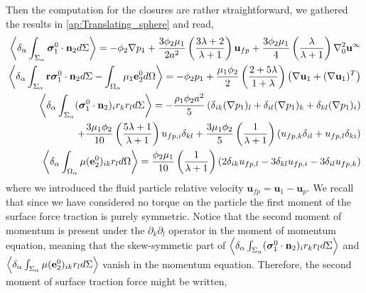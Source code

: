 Then the computation for the closures are rather straightforward, we gathered the results in \ref{ap:Translating_sphere} and read, 
\begin{align}
    \left<\delta_\alpha \int_{\Sigma_\alpha} \bm{\sigma}_1^0\cdot \textbf{n}_2 d\Sigma\right> = 
    - \phi_2 \mathbf{\nabla} p_1
    + \frac{3\phi_2\mu_1}{2 a^2} 
    \left(\frac{3\lambda+2}{\lambda+1}\right) \textbf{u}_{f p} 
    + \frac{3\phi_2\mu_1}{4} \left(\frac{\lambda}{\lambda+1}\right)\mathbf{\nabla}^2_0\textbf{u}^\infty\\
    \label{eq:first_mom}
    \left<\delta_\alpha \int_{\Sigma_\alpha} \textbf{r}\bm{\sigma}_1^0 \cdot \textbf{n}_2 d\Sigma - \int_{\Omega_\alpha} \mu_1 \textbf{e}^0_2 d\Omega\right> 
    = - \phi_2 p_1 + 
    \frac{\mu_1 \phi_2}{2} \left(\frac{2+5\lambda}{1+\lambda}\right)
         \left(\mathbf{\nabla} \textbf{u}_1+ (\mathbf{\nabla} \textbf{u}_1)^T\right)
        \\
        \left<\delta_\alpha \int_{\Sigma_\alpha} (\bm{\sigma}_1^0 \cdot \textbf{n}_2)_ir_kr_l d\Sigma\right> =
        - \frac{\rho_1\phi_2 a^2}{5}
        \left(
            \delta_{ik} (\mathbf{\nabla} p_1)_l
            +\delta_{il} (\mathbf{\nabla} p_1)_k
            +\delta_{kl} (\mathbf{\nabla} p_1)_i
        \right)\nonumber\\
        + \frac{3\mu_1\phi_2}{10}\left(\frac{5\lambda+1}{\lambda+1}\right)u_{fp,i}\delta_{kl}
        + \frac{3\mu_1\phi_2}{5}\left(\frac{1}{\lambda+1}\right)(u_{fp,k}\delta_{il}+u_{fp,l}\delta_{ki})
        \nonumber \\
        \left<\delta_\alpha \int_{\Omega_\alpha} {\mu(\textbf{e}_2^0)_{ik} r_l} d\Omega\right> =
        \frac{\phi_2\mu_1}{10}\left(\frac{1}{\lambda+1}\right)
        \left(
            2\delta_{ik}u_{fp,l}
            -3\delta_{kl}u_{fp,i}
            -3\delta_{il}u_{fp,k}
        \right)
\end{align}
where we introduced the fluid particle relative velocity $\textbf{u}_{fp} = \textbf{u}_1-\textbf{u}_p$. 
We recall that since we have considered no torque on the particle the first moment of the surface force traction is purely symmetric. 
Notice that the second moment of momentum is present under the $\partial_k\partial_l$ operator in the moment of momentum equation, meaning that the skew-symmetic part of $\left<\delta_\alpha \int_{\Sigma_\alpha} (\bm{\sigma}_1^0 \cdot \textbf{n}_2)_ir_kr_l d\Sigma\right> $ and $\left<\delta_\alpha \int_{\Sigma_\alpha} {\mu(\textbf{e}_2^0)_{ik} r_l} d\Sigma\right>$ vanish in the momentum equation. 
Therefore, the second moment of surface traction force might be written, 
